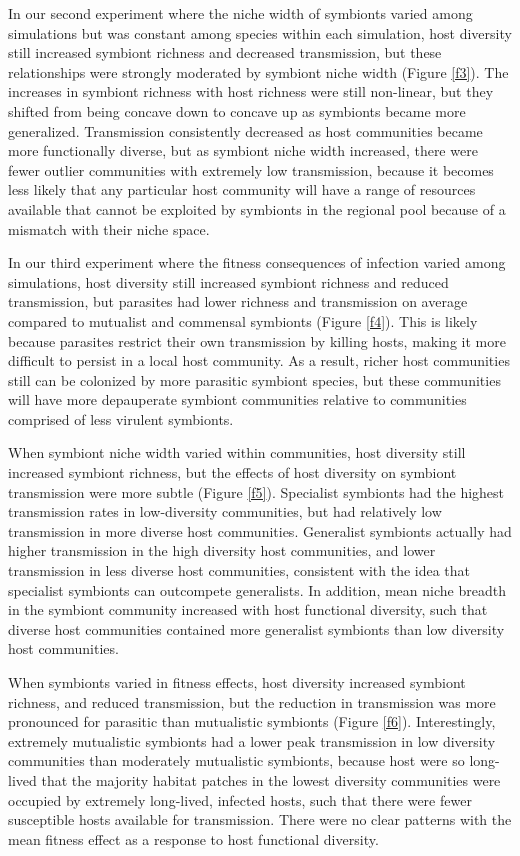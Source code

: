 \documentclass[12pt]{article}
\begin{document}
In our second experiment where the niche width of symbionts varied among simulations but was constant among species within each simulation, host diversity still increased symbiont richness and decreased transmission, but these relationships were strongly moderated by symbiont niche width (Figure \ref{f3}). 
The increases in symbiont richness with host richness were still non-linear, but they shifted from being concave down to concave up as symbionts became more generalized. 
Transmission consistently decreased as host communities became more functionally diverse, but as symbiont niche width increased, there were fewer outlier communities with extremely low transmission, because it becomes less likely that any particular host community will have a range of resources available that cannot be exploited by symbionts in the regional pool because of a mismatch with their niche space.

In our third experiment where the fitness consequences of infection varied among simulations, host diversity still increased symbiont richness and reduced transmission, but parasites had lower richness and transmission on average compared to mutualist and commensal symbionts (Figure \ref{f4}). 
This is likely because parasites restrict their own transmission by killing hosts, making it more difficult to persist in a local host community. 
As a result, richer host communities still can be colonized by more parasitic symbiont species, but these communities will have more depauperate symbiont communities relative to communities comprised of less virulent symbionts. 

When symbiont niche width varied within communities, host diversity still increased symbiont richness, but the effects of host diversity on symbiont transmission were more subtle (Figure \ref{f5}). 
Specialist symbionts had the highest transmission rates in low-diversity communities, but had relatively low transmission in more diverse host communities. 
Generalist symbionts actually had higher transmission in the high diversity host communities, and lower transmission in less diverse host communities, consistent with the idea that specialist symbionts can outcompete generalists. 
In addition, mean niche breadth in the symbiont community increased with host functional diversity, such that diverse host communities contained more generalist symbionts than low diversity host communities. 

When symbionts varied in fitness effects, host diversity increased symbiont richness, and reduced transmission, but the reduction in transmission was more pronounced for parasitic than mutualistic symbionts (Figure \ref{f6}). 
Interestingly, extremely mutualistic symbionts had a lower peak transmission in low diversity communities than moderately mutualistic symbionts, because host were so long-lived that the majority habitat patches in the lowest diversity communities were occupied by extremely long-lived, infected hosts, such that there were fewer susceptible hosts available for transmission. 
There were no clear patterns with the mean fitness effect as a response to host functional diversity. 
\end{document}

